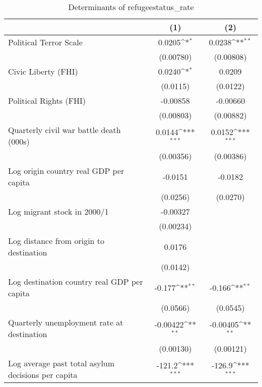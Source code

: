 \begin{table}[htbp]\centering
\def\sym#1{\ifmmode^{#1}\else\(^{#1}\)\fi}
\caption{Determinants of refugeestatus\_rate}
\begin{tabular}{l*{2}{c}}
\hline\hline
                    &\multicolumn{1}{c}{(1)}         &\multicolumn{1}{c}{(2)}         \\
\hline
Political Terror Scale&      0.0205\sym{*}  &      0.0238\sym{**} \\
                    &   (0.00780)         &   (0.00808)         \\
[1em]
Civic Liberty (FHI) &      0.0240\sym{*}  &      0.0209         \\
                    &    (0.0115)         &    (0.0122)         \\
[1em]
Political Rights (FHI)&    -0.00858         &    -0.00660         \\
                    &   (0.00803)         &   (0.00882)         \\
[1em]
Quarterly civil war battle death (000s)&      0.0144\sym{***}&      0.0152\sym{***}\\
                    &   (0.00356)         &   (0.00386)         \\
[1em]
Log origin country real GDP per capita&     -0.0151         &     -0.0182         \\
                    &    (0.0256)         &    (0.0270)         \\
[1em]
Log migrant stock in 2000/1&    -0.00327         &                     \\
                    &   (0.00234)         &                     \\
[1em]
Log distance from origin to destination&      0.0176         &                     \\
                    &    (0.0142)         &                     \\
[1em]
Log destination country real GDP per capita&      -0.177\sym{**} &      -0.166\sym{**} \\
                    &    (0.0566)         &    (0.0545)         \\
[1em]
Quarterly unemployment rate at destination&    -0.00422\sym{**} &    -0.00405\sym{**} \\
                    &   (0.00130)         &   (0.00121)         \\
[1em]
Log average past total asylum decisions per capita&      -121.2\sym{***}&      -126.9\sym{***}\\

\end{tabular}
\end{table}
